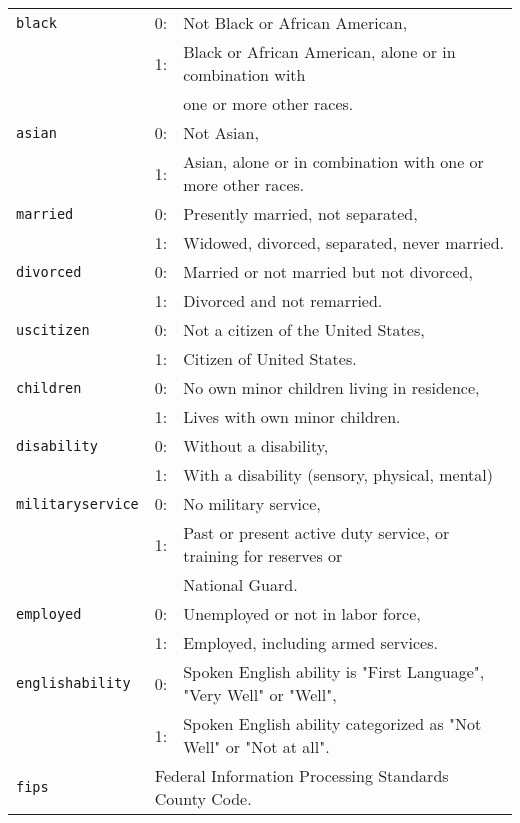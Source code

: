 \documentclass[11pt]{article}
\begin{document}
\begin{tabular}{lll}
\texttt{black} & 0: & Not Black or African American,\\
               & 1: & Black or African American, alone or in combination with\\ && one or more other races.\\
\texttt{asian} & 0: & Not Asian,\\
               & 1: & Asian, alone or in combination with one or more other races.\\
\texttt{married} & 0: & Presently married, not separated,\\
                         & 1: & Widowed, divorced, separated, never married.\\
\texttt{divorced} & 0: & Married or not married but not divorced,\\
                         & 1: & Divorced and not remarried.\\
\texttt{uscitizen} & 0: & Not a citizen of the United States,\\
                   & 1: & Citizen of United States.\\
\texttt{children} & 0: & No own minor children living in residence,\\
                         & 1: & Lives with own minor children.\\     
\texttt{disability} & 0: & Without a disability,\\
                         & 1:& With a disability (sensory, physical, mental)\\
\texttt{militaryservice} & 0: & No military service,\\
                         & 1: & Past or present active duty service, or training for reserves or \\ && National Guard. \\
\texttt{employed} & 0: & Unemployed or not in labor force,\\
                         & 1: & Employed, including armed services.\\
\texttt{englishability} & 0: & Spoken English ability is "First Language", "Very Well" or "Well",\\
                         & 1: & Spoken English ability categorized as "Not Well" or "Not at all".\\
\texttt{fips} & \multicolumn{2}{l}{Federal Information Processing Standards County Code.} \\
\end{tabular}
\end{document}
